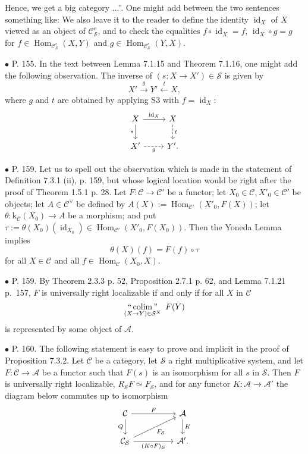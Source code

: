 \documentclass[12pt]{article}
\theoremstyle{remark}%
\newcommand{\bu}{\bullet}
\newcommand{\n}{\noindent}
\newcommand{\A}{\mathcal A}
\newcommand{\C}{\mathcal C}
\newcommand{\SSS}{\mathcal S}
\DeclareMathOperator*{\coli}{colim}
\DeclareMathOperator*{\icolim}{``\coli"}
\DeclareMathOperator{\id}{id}
\DeclareMathOperator{\Hom}{Hom}
\begin{document}
Hence, we get a big category ...''. One might add between the two sentences something like: We also leave it to the reader to define the identity $\id_X$ of $X$ viewed as an object of $\C^r_{\mathcal S}$, and to check the equalities $f\circ\id_X=f$, $\id_X\circ g=g$ for $f\in\Hom_{\C^r_{\mathcal S}}(X,Y)$ and $g\in\Hom_{\C^r_{\mathcal S}}(Y,X)$. 


\n$\bu$ P. 155. In the text between Lemma 7.1.15 and Theorem 7.1.16, one might add the following observation. The inverse of $(s:X\to X')\in\mathcal S$ is given by 
$$
X'\overset{g}{\to}Y'\overset{t}{\leftarrow}X,
$$
where $g$ and $t$ are obtained by applying S3 with $f=\id_X$:
$$
\begin{tikzcd}
X\ar{r}{\id_X}\ar{d}[swap]{s}&X\ar[dashed]{d}{t}\\ X'\ar[dashed]{r}[swap]{g}&Y'.
\end{tikzcd}
$$ 

%

\n$\bu$ P. 159. Let us to spell out the observation which is made in the statement of Definition 7.3.1 (ii), p. 159, but whose logical location would be right after the proof of Theorem 1.5.1 p. 28. Let $F:\C\to\C'$ be a functor; let $X_0\in\C,X'_0\in\C'$ be objects; let $A\in\C^\vee$ be defined by $A(X):=\Hom_{\C'}(X'_0,F(X))$; let $\theta:\text{k}_\C(X_0)\to A$ be a morphism; and put $\tau:=\theta(X_0)(\id_{X_0})\in\Hom_{\C'}(X'_0,F(X_0))$. Then the Yoneda Lemma implies 
$$
\theta(X)(f)=F(f)\circ\tau
$$
for all $X\in\C$ and all $f\in\Hom_\C(X_0,X)$. 

% 

\n$\bu$ P. 159. By Theorem 2.3.3 p. 52, Proposition 2.7.1 p. 62, and Lemma 7.1.21 p.~157, $F$ is universally right localizable if and only if for all $X$ in $\C$
$$
\icolim_{(X\to Y)\in\SSS^X}\ F(Y) 
$$
is represented by some object of $\A$. 


\n$\bu$ P. 160. The following statement is easy to prove and implicit in the proof of Proposition 7.3.2. Let $\C$ be a category, let $\SSS$ a right multiplicative system, and let $F:\C\to\A$ be a functor such that $F(s)$ is an isomorphism for all $s$ in $\SSS$. Then $F$ is universally right localizable, $R_{\SSS}F\simeq F_{\SSS}$, and for any functor $K:\A\to\A'$ the diagram below commutes up to isomorphism
$$
\begin{tikzcd}
\C\ar{rr}{F}\ar{d}[swap]{Q}&&\A\ar{d}{K}\\
\C_{\SSS}\ar{rr}[swap]{(K\circ F)_{\SSS}}\ar{rru}[swap]{F_{\SSS}}&&\A'.
\end{tikzcd}
$$ 
\end{document}
